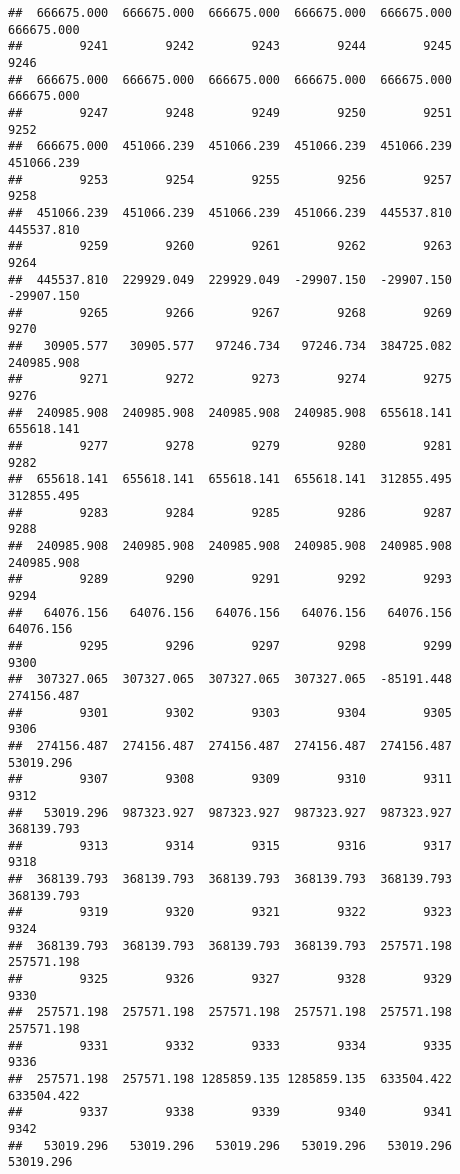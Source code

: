\documentclass[
]{book}
\begin{document}
\begin{verbatim}
##  666675.000  666675.000  666675.000  666675.000  666675.000  666675.000 
##        9241        9242        9243        9244        9245        9246 
##  666675.000  666675.000  666675.000  666675.000  666675.000  666675.000 
##        9247        9248        9249        9250        9251        9252 
##  666675.000  451066.239  451066.239  451066.239  451066.239  451066.239 
##        9253        9254        9255        9256        9257        9258 
##  451066.239  451066.239  451066.239  451066.239  445537.810  445537.810 
##        9259        9260        9261        9262        9263        9264 
##  445537.810  229929.049  229929.049  -29907.150  -29907.150  -29907.150 
##        9265        9266        9267        9268        9269        9270 
##   30905.577   30905.577   97246.734   97246.734  384725.082  240985.908 
##        9271        9272        9273        9274        9275        9276 
##  240985.908  240985.908  240985.908  240985.908  655618.141  655618.141 
##        9277        9278        9279        9280        9281        9282 
##  655618.141  655618.141  655618.141  655618.141  312855.495  312855.495 
##        9283        9284        9285        9286        9287        9288 
##  240985.908  240985.908  240985.908  240985.908  240985.908  240985.908 
##        9289        9290        9291        9292        9293        9294 
##   64076.156   64076.156   64076.156   64076.156   64076.156   64076.156 
##        9295        9296        9297        9298        9299        9300 
##  307327.065  307327.065  307327.065  307327.065  -85191.448  274156.487 
##        9301        9302        9303        9304        9305        9306 
##  274156.487  274156.487  274156.487  274156.487  274156.487   53019.296 
##        9307        9308        9309        9310        9311        9312 
##   53019.296  987323.927  987323.927  987323.927  987323.927  368139.793 
##        9313        9314        9315        9316        9317        9318 
##  368139.793  368139.793  368139.793  368139.793  368139.793  368139.793 
##        9319        9320        9321        9322        9323        9324 
##  368139.793  368139.793  368139.793  368139.793  257571.198  257571.198 
##        9325        9326        9327        9328        9329        9330 
##  257571.198  257571.198  257571.198  257571.198  257571.198  257571.198 
##        9331        9332        9333        9334        9335        9336 
##  257571.198  257571.198 1285859.135 1285859.135  633504.422  633504.422 
##        9337        9338        9339        9340        9341        9342 
##   53019.296   53019.296   53019.296   53019.296   53019.296   53019.296 

\end{verbatim}
\end{document}
